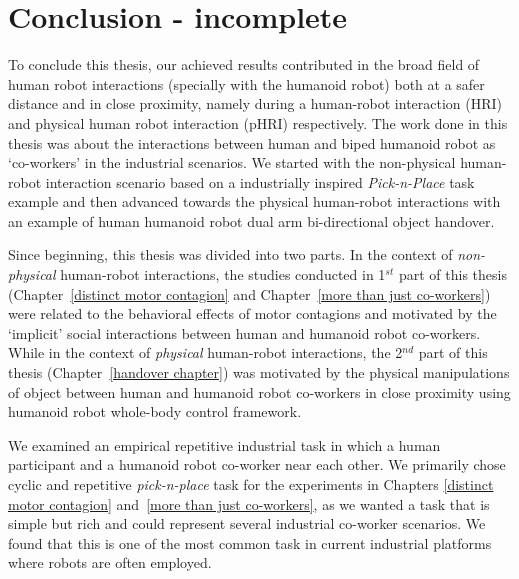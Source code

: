 
{\color{blue}\chapter*{Conclusion - incomplete}}
\pagestyle{plain}

To conclude this thesis, our achieved results contributed in the broad field of human robot interactions (specially with the humanoid robot) both at a safer distance and in close proximity, namely during a human-robot interaction (HRI) and physical human robot interaction (pHRI) respectively. The work done in this thesis was about the interactions between human and biped humanoid robot as `co-workers' in the industrial scenarios. We started with the non-physical human-robot interaction scenario based on a industrially inspired \textit{Pick-n-Place} task example and then advanced towards the physical human-robot interactions with an example of human humanoid robot dual arm bi-directional object handover.

Since beginning, this thesis was divided into two parts. In the context of \textit{non-physical} human-robot interactions, the studies conducted in 1$^{st}$ part of this thesis (Chapter~\ref{distinct motor contagion} and Chapter~\ref{more than just co-workers}) were related to the behavioral effects of motor contagions and motivated by the `implicit' social interactions between human and humanoid robot co-workers. While in the context of \textit{physical} human-robot interactions, the 2$^{nd}$ part of this thesis (Chapter~\ref{handover chapter}) was motivated by the physical manipulations of object between human and humanoid robot co-workers in close proximity using humanoid robot whole-body control framework.

We examined an empirical repetitive industrial task in which a human participant and a humanoid robot co-worker near each other. We primarily chose cyclic and repetitive \textit{pick-n-place} task for the experiments in Chapters \ref{distinct motor contagion} and~\ref{more than just co-workers}, as we wanted a task that is simple but rich and could represent several industrial co-worker scenarios. We found that this is one of the most common task in current industrial platforms where robots are often employed.

